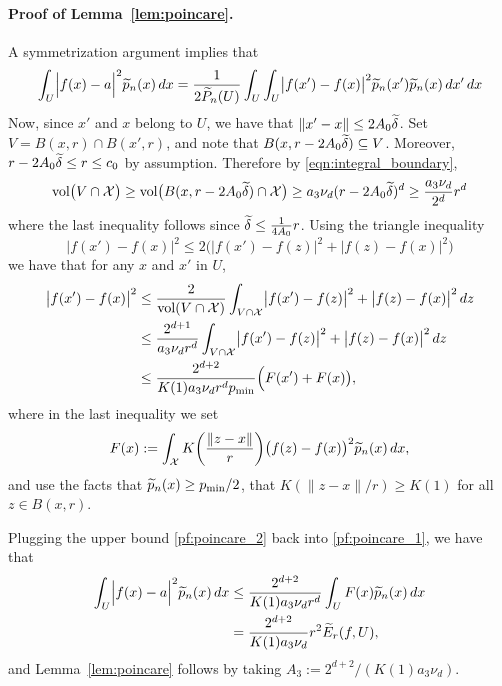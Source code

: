 \paragraph{Proof of Lemma~\ref{lem:poincare}.}
A symmetrization argument implies that
\begin{equation}
\label{pf:poincare_1}
\int_{U} \Bigl|f(x)-a\Bigr|^2 \widetilde{p}_n(x)\,dx = \frac{1}{2\widetilde{P}_n(U)} \int_{U} \int_{U} \bigl|f(x') - f(x)\bigr|^2 \widetilde{p}_n(x') \widetilde{p}_n(x) \,dx' \,dx
\end{equation}
Now, since $x'$ and $x$ belong to $U$, we have that $\|x' - x\| \leq 2A_0\widetilde{\delta}$. Set $V = B(x,r) \cap B(x',r)$, and note that $B(x,r - 2A_0\widetilde{\delta}) \subseteq V$. Moreover, $r - 2A_0\widetilde{\delta} \leq r \leq c_0$ by assumption. Therefore by \eqref{eqn:integral_boundary},
\begin{equation*}
\text{vol}\bigl(V \cap \mathcal{X}\bigr) \geq \text{vol}\bigl(B(x,r - 2A_0\widetilde{\delta}) \cap \mathcal{X}\bigr) \geq a_3 \nu_d (r - 2A_0\widetilde{\delta})^d \geq \frac{a_3 \nu_d}{2^d}r^d 
\end{equation*}
where the last inequality follows since $\widetilde{\delta} \leq \frac{1}{4A_0}r$. Using the triangle inequality 
\begin{equation*}
\bigl|f(x') - f(x)\big|^2 \leq 2\bigl(\bigl|f(x') - f(z)\big|^2 + \bigl|f(z) - f(x)\big|^2\bigr)
\end{equation*}
we have that for any $x$ and $x'$ in $U$,
\begin{align}
\bigl|f(x') - f(x)\big|^2 & \leq \frac{2}{\text{vol}(V \cap \mathcal{X})} \int_{V \cap \mathcal{X}} \bigl|f(x') - f(z)\big|^2 + \bigl|f(z) - f(x)\big|^2 \,dz \nonumber \\
& \leq \frac{2^{d + 1}}{a_3 \nu_d r^d} \int_{V \cap \mathcal{X}} \bigl|f(x') - f(z)\big|^2 + \bigl|f(z) - f(x)\big|^2 \,dz \nonumber \\
& \leq \frac{2^{d + 2}}{K(1) a_3 \nu_d r^d p_{\min}} \Bigl(F(x') + F(x)\bigr), \label{pf:poincare_2}
\end{align}
where in the last inequality we set
\begin{equation*}
F(x) := \int_{\mathcal{X}} K\biggl(\frac{\|z - x\|}{r}\biggr) \bigl(f(z) - f(x)\bigr)^2 \widetilde{p}_n(x) \,dx,
\end{equation*}
and use the facts that $\widetilde{p}_n(x) \geq p_{\min}/2$, that $K(\|z  - x\|/r) \geq K(1)$ for all $z \in B(x,r)$. 

Plugging the upper bound \eqref{pf:poincare_2} back into \eqref{pf:poincare_1}, we have that
\begin{align*}
\int_{U} \Bigl|f(x)-a\Bigr|^2 \widetilde{p}_n(x)\,dx & \leq \frac{2^{d + 2}}{K(1) a_3 \nu_d r^d} \int_{U} F(x)\widetilde{p}_n(x) \,dx \\
& = \frac{2^{d + 2}}{K(1) a_3 \nu_d}r^2 \widetilde{E}_r(f,U),
\end{align*}
and Lemma~\ref{lem:poincare} follows by taking $A_3 := 2^{d + 2}/(K(1) a_3 \nu_d)$.

